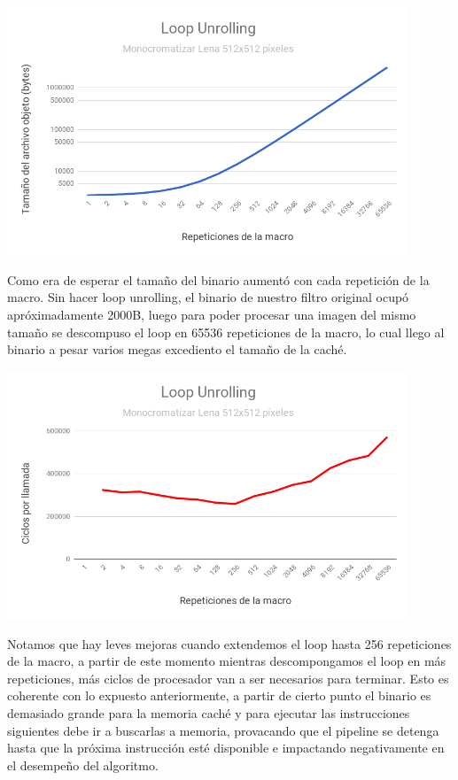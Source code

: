 \begin{center}

	\includegraphics[width=0.9\textwidth]{imagenes/loopunrolling/size.png}

\end{center}

Como era de esperar el tamaño del binario aumentó con cada repetición de la macro. Sin hacer loop unrolling, el binario de nuestro filtro original ocupó apróximadamente 2000B, luego para poder procesar una imagen del mismo tamaño se descompuso el loop en 65536 repeticiones de la macro, lo cual llego al binario a pesar varios megas excediento el tamaño de la caché.

\begin{center}

	\includegraphics[width=0.9\textwidth]{imagenes/loopunrolling/time.png}

\end{center}

Notamos que hay leves mejoras cuando extendemos el loop hasta 256 repeticiones de la macro, a partir de este momento mientras descompongamos el loop en más repeticiones, más ciclos de procesador van a ser necesarios para terminar. Esto es coherente con lo expuesto anteriormente, a partir de cierto punto el binario es demasiado grande para la memoria caché y para ejecutar las instrucciones siguientes debe ir a buscarlas a memoria, provacando que el pipeline se detenga hasta que la próxima instrucción esté disponible e impactando negativamente en el desempeño del algoritmo.